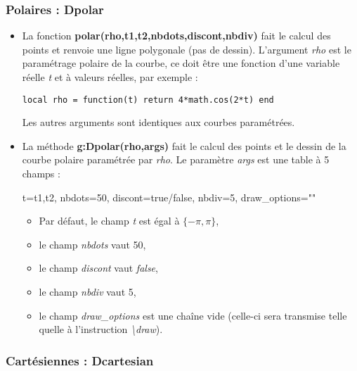 \documentclass[%
10pt,%
a4paper,%
french,%
]%
{article}%
\begin{document}
\subsubsection{Polaires : Dpolar}

\begin{itemize}
\item La fonction \textbf{polar(rho,t1,t2,nbdots,discont,nbdiv)} fait le calcul des points et renvoie une ligne polygonale (pas de dessin). L'argument \emph{rho} est le paramétrage polaire de la courbe, ce doit être une fonction d'une variable réelle \emph{t} et à valeurs
  réelles, par exemple :

    \texttt{local rho = function(t) return 4*math.cos(2*t) end}

    Les autres arguments sont identiques aux courbes paramétrées.
\item La méthode \textbf{g:Dpolar(rho,args)} fait le calcul des points et le  dessin de la courbe polaire paramétrée par \emph{rho}.  Le paramètre \emph{args} est une table à 5 champs :

\begin{TeXcode}
  { t={t1,t2}, nbdots=50, discont=true/false, nbdiv=5, draw_options="" }
\end{TeXcode}

  \begin{itemize}
      \item Par défaut, le champ \emph{t} est égal à $\{-\pi,\pi\}$,
      \item le champ \emph{nbdots} vaut 50,
      \item le champ \emph{discont} vaut \emph{false}, 
      \item le champ \emph{nbdiv} vaut 5, 
      \item le champ \emph{draw\_options} est une chaîne vide (celle-ci sera transmise telle quelle à l'instruction \emph{\textbackslash draw}).
  \end{itemize}
\end{itemize}

\subsubsection{Cartésiennes : Dcartesian}
\end{document}
